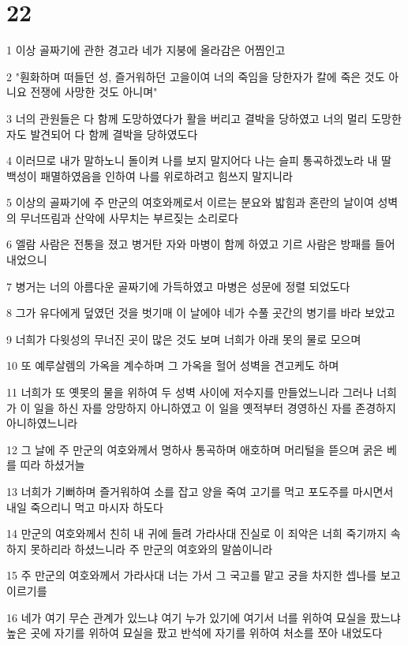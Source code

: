 \chapter{22}

\par 1 이상 골짜기에 관한 경고라 네가 지붕에 올라감은 어찜인고
\par 2 "훤화하며 떠들던 성, 즐거워하던 고을이여 너의 죽임을 당한자가 칼에 죽은 것도 아니요 전쟁에 사망한 것도 아니며"
\par 3 너의 관원들은 다 함께 도망하였다가 활을 버리고 결박을 당하였고 너의 멀리 도망한 자도 발견되어 다 함께 결박을 당하였도다
\par 4 이러므로 내가 말하노니 돌이켜 나를 보지 말지어다 나는 슬피 통곡하겠노라 내 딸 백성이 패멸하였음을 인하여 나를 위로하려고 힘쓰지 말지니라
\par 5 이상의 골짜기에 주 만군의 여호와께로서 이르는 분요와 밟힘과 혼란의 날이여 성벽의 무너뜨림과 산악에 사무치는 부르짖는 소리로다
\par 6 엘람 사람은 전통을 졌고 병거탄 자와 마병이 함께 하였고 기르 사람은 방패를 들어 내었으니
\par 7 병거는 너의 아름다운 골짜기에 가득하였고 마병은 성문에 정렬 되었도다
\par 8 그가 유다에게 덮였던 것을 벗기매 이 날에야 네가 수풀 곳간의 병기를 바라 보았고
\par 9 너희가 다윗성의 무너진 곳이 많은 것도 보며 너희가 아래 못의 물로 모으며
\par 10 또 예루살렘의 가옥을 계수하며 그 가옥을 헐어 성벽을 견고케도 하며
\par 11 너희가 또 옛못의 물을 위하여 두 성벽 사이에 저수지를 만들었느니라 그러나 너희가 이 일을 하신 자를 앙망하지 아니하였고 이 일을 옛적부터 경영하신 자를 존경하지 아니하였느니라
\par 12 그 날에 주 만군의 여호와께서 명하사 통곡하며 애호하며 머리털을 뜯으며 굵은 베를 띠라 하셨거늘
\par 13 너희가 기뻐하며 즐거워하여 소를 잡고 양을 죽여 고기를 먹고 포도주를 마시면서 내일 죽으리니 먹고 마시자 하도다
\par 14 만군의 여호와께서 친히 내 귀에 들려 가라사대 진실로 이 죄악은 너희 죽기까지 속하지 못하리라 하셨느니라 주 만군의 여호와의 말씀이니라
\par 15 주 만군의 여호와께서 가라사대 너는 가서 그 국고를 맡고 궁을 차지한 셉나를 보고 이르기를
\par 16 네가 여기 무슨 관계가 있느냐 여기 누가 있기에 여기서 너를 위하여 묘실을 팠느냐 높은 곳에 자기를 위하여 묘실을 팠고 반석에 자기를 위하여 처소를 쪼아 내었도다
